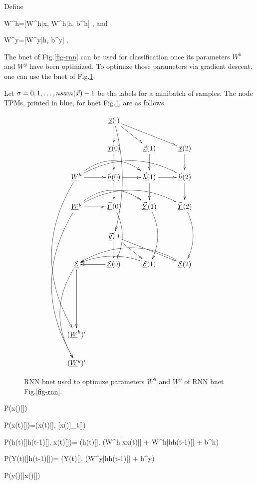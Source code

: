 Define

\beq
W^h=[W^{h|x}, W^{h|h}, b^h]
\;,
\eeq
and

\beq
W^y=[W^{y|h}, b^y]
\;.
\eeq

The bnet of Fig.\ref{fig-rnn}
can be used for
classification once 
its parameters 
$W^h$ and $W^y$
have been optimized.
To optimize
those parameters via gradient
descent,
one can use the bnet 
of Fig.\ref{fig-rnn-ext}.

Let $\sigma=0,1, \ldots, nsam({\vec{x}})-1$
be the labels for a minibatch of samples.
The node TPMs,
 printed in blue,
for bnet Fig.\ref{fig-rnn-ext},
 are as follows.



\begin{figure}[h!]
\centering
$$\xymatrix{
&\ranvec{x}(\cdot)\ar[d]\ar[dr]\ar[drr]
\ar@/^1pc/[dddd]
\\
&\vec{\rvx}(0)\ar[d]&
\vec{\rvx}(1)\ar[d]&
\vec{\rvx}(2)\ar[d]\\
\rvW^h\ar[r]\ar@/^2pc/[rr]\ar@/^2pc/[rrr]
\ar@/_3pc/[dddddd]
&\vec{\rvh}(0)\ar[d]\ar[r]&
\vec{\rvh}(1)\ar[d]\ar[r]&
\vec{\rvh}(2)\ar[d]\\
\rvW^y\ar[r]\ar@/^2pc/[rr]\ar@/^2pc/[rrr]
\ar@/_3pc/[dddddd]
&\vec{\rvY}(0)\ar@/^1pc/[dd]&
\vec{\rvY}(1)\ar@/^1pc/[dd]&
\vec{\rvY}(2)\ar@/^1pc/[dd]
\\
&
\ranvec{y}(\cdot)\ar[d]\ar[dr]\ar[drr]
\\
\ul{\cale}\ar[ddd]
\ar@/_2pc/[dddd]&
\ul{\cale}(0)\ar[l]&
\ul{\cale}(1)\ar@/_1pc/[ll]&
\ul{\cale}(2)\ar@/_2pc/[lll]
\\
\\
\\
(\rvW^h)'\\
(\rvW^y)'
}
$$
\caption{RNN bnet used
to optimize parameters $W^h$
and $W^y$ of RNN bnet Fig.\ref{fig-rnn}.}
\label{fig-rnn-ext}
\end{figure}

\beq\color{blue}
P(x(\cdot)[\sigma])
\eeq

\beq\color{blue}
P(x(t)[\sigma])=\delta(x(t)[\sigma],
[x(\cdot)]_t[\sigma])
\eeq

\beq\color{blue}
P(h(t)[\sigma]\cond h(t-1)[\sigma], x(t)[\sigma])=
\delta(h(t)[\sigma],
\cala(W^{h|x}x(t)[\sigma] + W^{h|h}h(t-1)[\sigma] + b^h)
\eeq

\beq\color{blue}
P(Y(t)[\sigma]\cond h(t-1)[\sigma])=
\delta(Y(t)[\sigma],
\cala(W^{y|h}h(t-1)[\sigma] + b^y)
\eeq

\beq\color{blue}
P(y(\cdot)[\sigma]\cond x(\cdot)[\sigma])
\eeq


